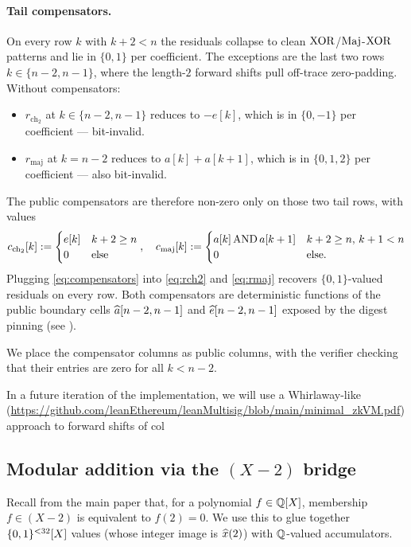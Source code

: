 \paragraph{Tail compensators.}
On every row $k$ with $k+2 < n$ the residuals collapse to clean
$\operatorname{XOR}$/$\operatorname{Maj}$-$\operatorname{XOR}$ patterns and lie in $\{0,1\}$ per coefficient. The
exceptions are the last two rows $k \in \{n-2, n-1\}$, where the
length-$2$ forward shifts pull off-trace zero-padding. Without
compensators:
\begin{itemize}
\item $r_{\mathrm{ch}_2}$ at $k \in \{n-2,n-1\}$ reduces to $-e[k]$,
which is in $\{0,-1\}$ per coefficient — bit-invalid.
\item $r_{\mathrm{maj}}$ at $k = n-2$ reduces to $a[k]+a[k+1]$, which
is in $\{0,1,2\}$ per coefficient — also bit-invalid.
\end{itemize}
The public compensators are therefore non-zero only on those two tail
rows, with values
\begin{equation}\label{eq:compensators}
c_{\mathrm{ch}_2}[k] := \begin{cases} e[k] & k+2 \ge n \\ 0 & \text{else}\end{cases}, \quad
c_{\mathrm{maj}}[k]  := \begin{cases} a[k] \operatorname{AND} a[k+1] & k+2 \ge n,\, k+1 < n \\ 0 & \text{else}.\end{cases}
\end{equation}
Plugging \eqref{eq:compensators} into \eqref{eq:rch2} and \eqref{eq:rmaj}
recovers $\{0,1\}$-valued residuals on every row. Both compensators are
deterministic functions of the public boundary cells $\widehat{a}[n-2,n-1]$
and $\widehat{e}[n-2,n-1]$ exposed by the digest pinning (see
). 

We place the compensator columns as public columns, with the verifier checking that their entries are zero for all $k<n-2$. 

In a future iteration of the implementation, we will use a Whirlaway-like (\url{https://github.com/leanEthereum/leanMultisig/blob/main/minimal_zkVM.pdf}) approach to forward shifts of col

\subsection{Modular addition via the $(X-2)$ bridge}\label{sec:mod-add}

Recall from the main paper that, for a polynomial $f \in \mathbb{Q}[X]$,
membership $f \in (X-2)$ is equivalent to $f(2)=0$. We use this to
glue together $\{0,1\}^{<32}[X]$ values (whose integer image is $\widehat{x}(2)$)
with $\mathbb{Q}$-valued accumulators.

